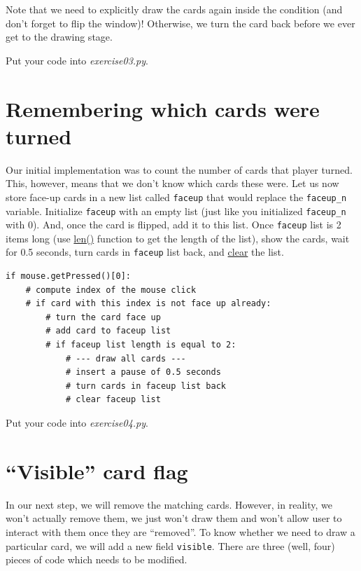 \documentclass[
]{book}
\begin{document}
Note that we need to explicitly draw the cards again inside the condition (and don't forget to flip the window)! Otherwise, we turn the card back before we ever get to the drawing stage.

Put your code into \emph{exercise03.py}.

\hypertarget{remembering-which-cards-were-turned}{%
\section{Remembering which cards were turned}\label{remembering-which-cards-were-turned}}

Our initial implementation was to count the number of cards that player turned. This, however, means that we don't know which cards these were. Let us now store face-up cards in a new list called \texttt{faceup} that would replace the \texttt{faceup\_n} variable. Initialize \texttt{faceup} with an empty list (just like you initialized \texttt{faceup\_n} with 0). And, once the card is flipped, add it to this list. Once \texttt{faceup} list is 2 items long (use \href{https://docs.python.org/3/library/functions.html?highlight=len\#len}{len()} function to get the length of the list), show the cards, wait for 0.5 seconds, turn cards in \texttt{faceup} list back, and \href{https://docs.python.org/3/tutorial/datastructures.html\#more-on-lists}{clear} the list.

\begin{verbatim}
if mouse.getPressed()[0]:
    # compute index of the mouse click
    # if card with this index is not face up already:
        # turn the card face up
        # add card to faceup list
        # if faceup list length is equal to 2:
            # --- draw all cards ---
            # insert a pause of 0.5 seconds
            # turn cards in faceup list back
            # clear faceup list
\end{verbatim}

Put your code into \emph{exercise04.py}.

\hypertarget{visible-card-flag}{%
\section{``Visible'' card flag}\label{visible-card-flag}}

In our next step, we will remove the matching cards. However, in reality, we won't actually remove them, we just won't draw them and won't allow user to interact with them once they are ``removed''. To know whether we need to draw a particular card, we will add a new field \texttt{visible}. There are three (well, four) pieces of code which needs to be modified.
\end{document}
